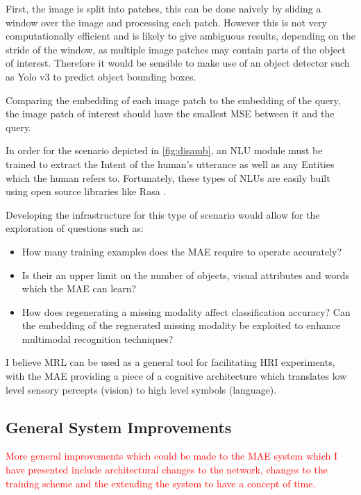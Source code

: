 First, the image is split into patches, this can be done naively by sliding a window over the image and processing each patch. However this is not very computationally efficient and is likely to give ambiguous results, depending on the stride of the window, as multiple image patches may contain parts of the object of interest. Therefore it would be sensible to make use of an object detector such as Yolo v3 \cite{redmon2018yolov3} to predict object bounding boxes.

Comparing the embedding of each image patch to the embedding of the query, the image patch of interest should have the smallest \ac{MSE} between it and the query.

In order for the scenario depicted in \autoref{fig:disamb}, an \ac{NLU} module must be trained to extract the Intent of the human's utterance as well as any Entities which the human refers to. Fortunately, these types of \acp{NLU} are easily built using open source libraries like Rasa \cite{rasa}.



Developing the infrastructure for this type of scenario would allow for the exploration of questions such as:

\begin{itemize}
\item How many training examples does the \ac{MAE} require to operate accurately?
\item Is their an upper limit on the number of objects, visual attributes and words which the \ac{MAE} can learn?
\item How does regenerating a missing modality affect classification accuracy? Can the embedding of the regnerated missing modality be exploited to enhance  multimodal recognition techniques?
\end{itemize}

I believe \ac{MRL} can be used as a general tool for facilitating \ac{HRI} experiments, with the \ac{MAE} providing a piece of a cognitive architecture which translates low level sensory percepts (vision) to high level symbols (language).



\subsection{General System Improvements}
\textcolor{red}{More general improvements which could be made to the \ac{MAE} system which I have presented include architectural changes to the network, changes to the training scheme and the extending the system to have a concept of time.}

